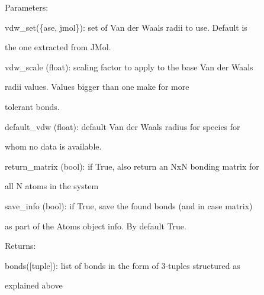 \documentclass[letterpaper,10pt,english]{sphinxmanual}
\begin{document}
\begin{fulllineitems}
\begin{DUlineblock}{0em}
\item[] Parameters:
\item[]
\begin{DUlineblock}{\DUlineblockindent}
\item[] vdw\_set(\{ase, jmol\}): set of Van der Waals radii to use. Default is
\item[]
\begin{DUlineblock}{\DUlineblockindent}
\item[] the one extracted from JMol.
\end{DUlineblock}
\item[] vdw\_scale (float): scaling factor to apply to the base Van der Waals
\item[]
\begin{DUlineblock}{\DUlineblockindent}
\item[] radii values. Values bigger than one make for more
\item[] tolerant bonds.
\end{DUlineblock}
\item[] default\_vdw (float): default Van der Waals radius for species for
\item[]
\begin{DUlineblock}{\DUlineblockindent}
\item[] whom no data is available.
\end{DUlineblock}
\item[] return\_matrix (bool): if True, also return an NxN bonding matrix for
\item[]
\begin{DUlineblock}{\DUlineblockindent}
\item[] all N atoms in the system
\end{DUlineblock}
\item[] save\_info (bool): if True, save the found bonds (and in case matrix)
\item[]
\begin{DUlineblock}{\DUlineblockindent}
\item[] as part of the Atoms object info. By default True.
\end{DUlineblock}
\end{DUlineblock}
\end{DUlineblock}

\begin{DUlineblock}{0em}
\item[] Returns:
\item[]
\begin{DUlineblock}{\DUlineblockindent}
\item[] bonds({[}tuple{]}): list of bonds in the form of 3-tuples structured as
\item[]
\begin{DUlineblock}{\DUlineblockindent}
\item[] explained above
\end{DUlineblock}
\end{DUlineblock}
\end{DUlineblock}


\end{fulllineitems}
\end{document}
